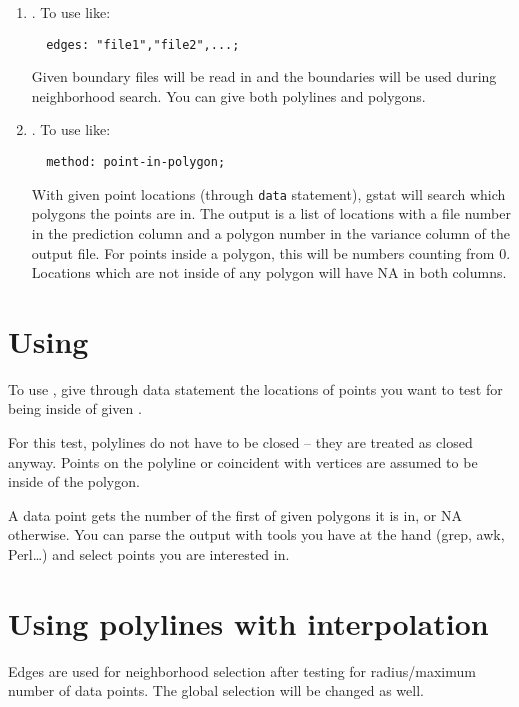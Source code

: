 \begin{enumerate}
\item \edges{}. To use like:
  
\begin{verbatim}
  edges: "file1","file2",...;
\end{verbatim}  
  Given boundary files will be read in and the boundaries will be used
  during neighborhood search. You can give both polylines and polygons.
  
\item \pip{}. To use like: 
  
\begin{verbatim}
  method: point-in-polygon;
\end{verbatim}  
  With given point locations (through \texttt{data} statement), gstat
  will search which polygons the points are in.  The output is a list
  of locations with a file number in the prediction column and a
  polygon number in the variance column of the output file. For points
  inside a polygon, this will be numbers counting  from 0.  Locations
  which are not inside of any polygon will have NA in both columns.
  
\end{enumerate}   


\section{Using \pipt{}}
\label{sec:Using-pipt}

To use \pipt{}, give through data statement the locations of points you
want to test for being inside of given \edges{}.

For this test, polylines do not have to be closed -- they are treated
as closed anyway. Points on the polyline or coincident with vertices
are assumed to be inside of the polygon.

A data point gets the number of the first of given polygons it is in,
or NA otherwise. You can parse the output with tools you have at the
hand (grep, awk, Perl\dots{}) and select points you are interested in.

\section{Using polylines with interpolation}
\label{sec:int-poly}


Edges are used for neighborhood selection after testing for
radius/maximum number of data points. The global selection will be
changed as well.

